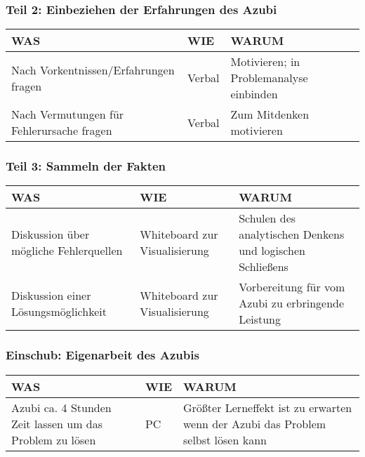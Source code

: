 \documentclass{beamer}
\begin{document}
\setcounter{subsection}{1}
\begin{frame}
  \frametitle{Teil 2: Einbeziehen der Erfahrungen des Azubi}

        \begin{tabular}{|p{3.3cm}|p{1.3cm}|p{5.3cm}|}
        \hline
        WAS & WIE & WARUM \\ \hline
        Nach Vorkentnissen/Erfahrungen fragen & Verbal & Motivieren; in Problemanalyse einbinden \\ \hline
        Nach Vermutungen für Fehlerursache fragen & Verbal & Zum Mitdenken motivieren \\ \hline
       \end{tabular}        


\end{frame}

\setcounter{subsection}{1}
\begin{frame}
  \frametitle{Teil 3: Sammeln der Fakten}
  
        \begin{tabular}{|p{3.3cm}|p{3.3cm}|p{3.3cm}|}
        \hline
        WAS & WIE & WARUM \\ \hline
        Diskussion über mögliche Fehlerquellen & Whiteboard zur \mbox{Visualisierung} & Schulen des analytischen Denkens und logischen Schließens \\ \hline
        Diskussion einer Lösungsmöglichkeit & Whiteboard zur \mbox{Visualisierung} & Vorbereitung für vom Azubi zu erbringende Leistung \\ \hline
       \end{tabular}

  

\end{frame}

\setcounter{subsection}{1}
\begin{frame}
  \frametitle{Einschub: Eigenarbeit des Azubis}
  
        \begin{tabular}{|p{3.3cm}|p{1.3cm}|p{5.3cm}|}
        \hline
        WAS & WIE & WARUM \\ \hline
        Azubi ca. 4 Stunden Zeit lassen um das Problem zu lösen & PC & Größter Lerneffekt ist zu erwarten wenn der Azubi das Problem selbst lösen kann \\ \hline
       \end{tabular}  

\end{frame}
\end{document}
